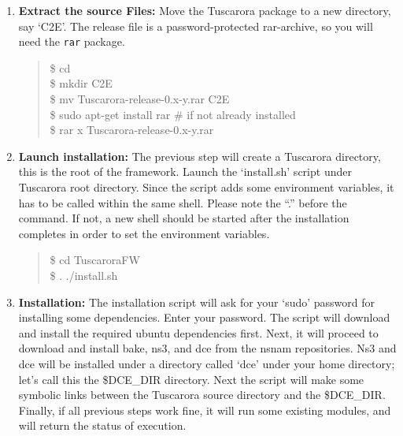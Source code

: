 \begin{enumerate}
\item \textbf{Extract the source Files:} Move the Tuscarora package to
  a new directory, say `C2E'. The release file is a password-protected
  rar-archive, so you will need the \texttt{rar} package.
\begin{quote}
	\$ cd \\
	\$ mkdir C2E\\
	\$ mv Tuscarora-release-0.x-y.rar C2E\\
	\$ sudo apt-get install rar \# if not already installed\\
	\$ rar x Tuscarora-release-0.x-y.rar\\
\end{quote}

\item \textbf{Launch installation:} The previous step will create a Tuscarora directory, this is the root of the framework. Launch the `install.sh' script under 
Tuscarora root directory. 
Since the script adds some environment variables, it has to be called within the same shell. Please note the ``.'' before the command. 
If not, a new shell should be started after the installation completes in order to set the environment variables. 
\begin{quote}
	\$ cd TuscaroraFW\\
	\$ . ./install.sh\\
\end{quote}
\item \textbf{Installation:}  The installation script will ask for
  your `sudo' password for installing some dependencies. Enter your
  password. The script will download and install the required ubuntu dependencies
  first. Next, it will proceed to download and install bake, ns3, and
  dce from the nsnam repositories. Ns3 and dce will be installed under
  a directory called `dce' under your home directory; let's call this
  the \$DCE\_DIR directory. Next the script will make some symbolic
  links between the Tuscarora source directory and the
  \$DCE\_DIR. Finally, if all previous steps work fine, it will run
  some existing modules, and will return the status of execution.

\end{enumerate}


